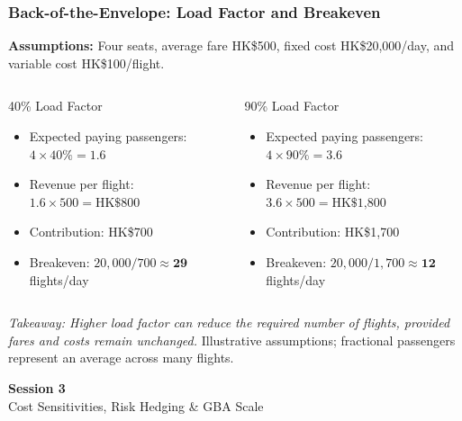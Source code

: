 \documentclass{beamer}
\begin{document}
\begin{frame}[t,shrink=15]
  \frametitle{Back-of-the-Envelope: Load Factor and Breakeven}
  \textbf{Assumptions:} Four seats, average fare HK\$500, fixed cost HK\$20,000/day, and variable cost HK\$100/flight.
  \begin{columns}[T]
    \begin{column}{0.48\textwidth}
      \begin{block}{40\% Load Factor}
      \begin{itemize}
        \item Expected paying passengers: $4\times40\%=1.6$
        \item Revenue per flight: $1.6\times500=\text{HK\$800}$
        \item Contribution: HK\$700
        \item Breakeven: $20{,}000/700\approx\mathbf{29}$ flights/day
      \end{itemize}
      \end{block}
    \end{column}
    \begin{column}{0.48\textwidth}
      \begin{block}{90\% Load Factor}
      \begin{itemize}
        \item Expected paying passengers: $4\times90\%=3.6$
        \item Revenue per flight: $3.6\times500=\text{HK\$1,800}$
        \item Contribution: HK\$1,700
        \item Breakeven: $20{,}000/1{,}700\approx\mathbf{12}$ flights/day
      \end{itemize}
      \end{block}
    \end{column}
  \end{columns}
  \textit{Takeaway: Higher load factor can reduce the required number of flights, provided fares and costs remain unchanged.}
  \vfill
  {\tiny Illustrative assumptions; fractional passengers represent an average across many flights.}
\end{frame}

\begin{frame}[c]
  \begin{center}
    \huge\color{cuhkpurple}\textbf{Session 3}\\
    \vspace{0.5cm}
    \Large Cost Sensitivities, Risk Hedging \& GBA Scale
  \end{center}
\end{frame}
\end{document}
